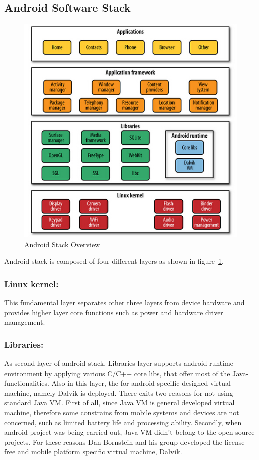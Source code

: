 \subsection{Android Software Stack}
\begin{figure}[!htbp]
	\centering
	\includegraphics[width=1.0\textwidth]{android-stack.jpg}
		\caption{Android Stack Overview \cite{learn_android}}
	\label{fig:android-stack}
\end{figure}
Android stack is composed of four different layers as shown in figure~\ref{fig:android-stack}.

\subsubsection{Linux kernel:}This fundamental layer separates other three layers  from  device hardware and provides higher layer core  functions such as  power and hardware driver management.
\subsubsection{Libraries:}As second layer of android stack,  Libraries layer supports android runtime environment by applying various C/C++ core libs, that offer most of the Java-functionalities.  Also in this layer, the for android specific designed virtual machine, namely Dalvik\cite{learn_android} is deployed. There exits two reasons for not using standard Java VM\cite{learn_android}. First of all, since Java VM is general developed virtual machine, therefore some constrains from mobile systems and devices are not concerned, such as limited battery life and processing ability. Secondly, when android project  was being carried out,  Java VM didn't  belong  to the open source projects. For these reasons Dan Bornstein and his group developed the license free and mobile platform specific virtual machine, Dalvik. 

